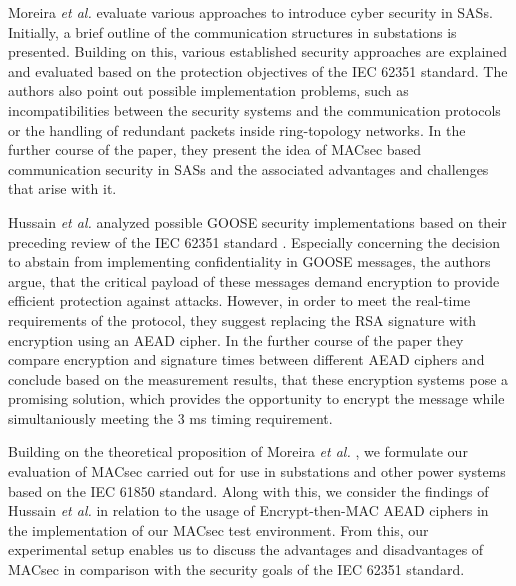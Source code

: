 \documentclass[conference, onecolumn, a4paper]{IEEEtran}
\begin{document}
\smallskip
Moreira \textit{et al.} \cite{Cybersecurity_Substation:2016} evaluate various approaches to introduce cyber security in SASs. Initially, a brief outline 
of the communication structures in substations is presented. Building on this, various established security approaches are explained and evaluated based 
on the protection objectives of the IEC 62351 standard. The authors also point out possible implementation problems, such as incompatibilities between 
the security systems and the communication protocols or the handling of redundant packets inside ring-topology networks. In the further course of the 
paper, they present the idea of MACsec based communication security in SASs and the associated advantages and challenges that arise with it. 

\smallskip
Hussain \textit{et al.} \cite{GOOSE_confidentiality_integrity:2020} analyzed possible GOOSE security implementations based on their preceding review 
of the IEC 62351 standard \cite{Review_IEC62351:2019}. Especially concerning the decision to abstain from implementing confidentiality in GOOSE messages, 
the authors argue, that the critical payload of these messages demand encryption to provide efficient protection against attacks. However, in order to 
meet the real-time requirements of the protocol, they suggest replacing the RSA signature with encryption using an AEAD cipher. In the further course 
of the paper they compare encryption and signature times between different AEAD ciphers and conclude based on the measurement results, that these encryption 
systems pose a promising solution, which provides the opportunity to encrypt the message while simultaniously  meeting the 3 ms timing requirement.

\smallskip 
Building on the theoretical proposition of Moreira \textit{et al.} \cite{Cybersecurity_Substation:2016}, we formulate our evaluation of MACsec carried 
out for use in substations and other power systems based on the IEC 61850 standard. Along with this, we consider the findings of Hussain \textit{et al.} 
\cite{GOOSE_confidentiality_integrity:2020} in relation to the usage of Encrypt-then-MAC AEAD ciphers in the implementation of our MACsec test environment. 
From this, our experimental setup enables us to discuss the advantages and disadvantages of MACsec in comparison with the security goals of the IEC 62351 
standard. 

\end{document}

